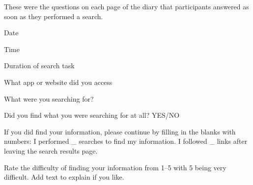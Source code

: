 These were the questions on each page of the diary that participants answered as soon as they performed a search.
\begin{tight_enumerate}
            \item Date
            \item Time
            \item Duration of search task 
            \item What app or website did you access
            \item What were you searching for?
            \item Did you find what you were searching for at all? YES/NO
            \item If you did find your information, please continue by filling in the blanks with numbers: I performed \_ searches to find my information. I followed \_ links after leaving the search results page.
            \item Rate the difficulty of finding your information from 1--5 with 5 being very difficult. Add text to explain if you like.
\end{tight_enumerate}


